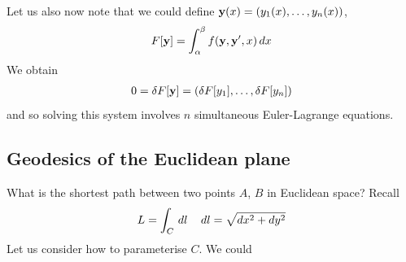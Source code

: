 \documentclass{../../template/note}
\begin{document}
    Let us also now note that we could define $\V y(x) = (y_1(x), \dots, y_n(x))$,
    \begin{align*}
        F[\V y] = \int_\alpha^\beta f(\V y, \V y', x) \D x
    \end{align*}
    We obtain
    \begin{align*}
        0 = \delta F[\V y] = (\delta F[y_1], \dots, \delta F[y_n])
    \end{align*}
    and so solving this system involves $n$ simultaneous Euler-Lagrange equations.
    
    \subsection{Geodesics of the Euclidean plane}

    What is the shortest path between two points $A$, $B$ in Euclidean space? Recall
    \begin{align*}
        L = \int_C \,d{l} && \,d{l} = \sqrt{dx^2 + dy^2}
    \end{align*}
    Let us consider how to parameterise $C$. We could
\end{document}
